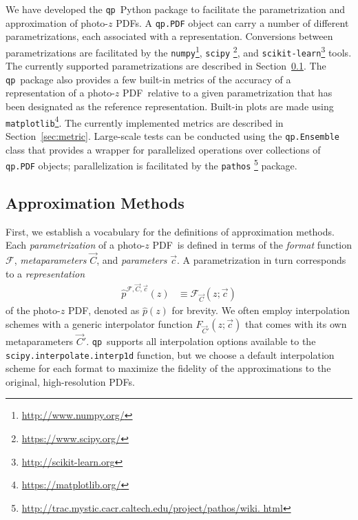 \documentclass[\docopts]{\docclass}
\newcommand{\qp}{\texttt{qp}}
\newcommand{\pz}{photo-$z$ PDF}
\begin{document}
We have developed the \qp\ Python package to facilitate the parametrization and 
approximation of \pz s.
A \texttt{qp.PDF} object can carry a number of different parametrizations, each 
associated with a representation.
Conversions between parametrizations are facilitated by the 
\texttt{numpy}\footnote{\url{http://www.numpy.org/}}, \texttt{scipy} 
\footnote{\url{https://www.scipy.org/}}, and 
\texttt{scikit-learn}\footnote{\url{http://scikit-learn.org}} 
\citep{pedregosa_scikit-learn:_2011} tools.
The currently supported parametrizations are described in 
Section~\ref{sec:approx}.
The \qp\ package also provides a few built-in metrics of the accuracy of a 
representation of a \pz\ relative to a given parametrization that has been 
designated as the reference representation.
Built-in plots are made using 
\texttt{matplotlib}\footnote{\url{https://matplotlib.org/}}.
The currently implemented metrics are described in Section~\ref{sec:metric}.
Large-scale tests can be conducted using the \texttt{qp.Ensemble} class that 
provides a wrapper for parallelized operations over collections of 
\texttt{qp.PDF} objects; parallelization is facilitated by the \texttt{pathos} 
\footnote{\noindent\url{http://trac.mystic.cacr.caltech.edu/project/pathos/wiki.
html}} \citep{mckerns_building_2012, mckerns_pathos:_2010} package.

\subsection{Approximation Methods}
\label{sec:approx}

First, we establish a vocabulary for the definitions of approximation methods.
Each \textit{parametrization} of a \pz\ is defined in terms of the 
\textit{format} function $\mathcal{F}$, \textit{metaparameters} $\vec{C}$, and 
\textit{parameters} $\vec{c}$.
A parametrization in turn corresponds to a \textit{representation}
\begin{align}
  \label{eq:definition}
  \hat{p}^{\mathcal{F}, \vec{C}, \vec{c}}(z) &\equiv \mathcal{F}_{\vec{C}}(z; 
\vec{c})
\end{align}
of the \pz, denoted as $\hat{p}(z)$ for brevity.
We often employ interpolation schemes with a generic interpolator function 
$F_{\vec{C}'}(z; \vec{c})$ that comes with its own metaparameters $\vec{C}'$.
\qp\ supports all interpolation options available to the 
\texttt{scipy.interpolate.interp1d} function, but we choose a default 
interpolation scheme for each format to maximize the fidelity of the 
approximations to the original, high-resolution PDFs.
\end{document}
